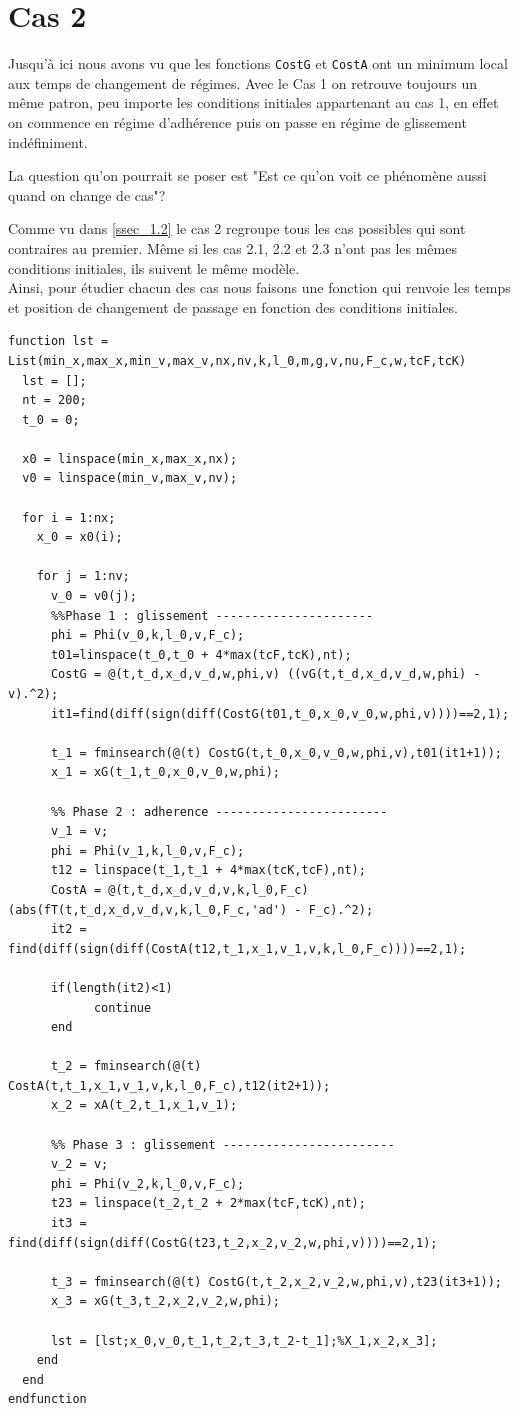\documentclass{article}
\begin{document}
\newpage
\section{Cas 2}
Jusqu'à ici nous avons vu que les fonctions \verb|CostG| et \verb|CostA| ont un minimum local aux temps de changement de régimes. Avec le Cas 1 on retrouve toujours un même patron, peu importe les conditions initiales appartenant au cas 1, en effet on commence en régime d'adhérence puis on passe en régime de glissement indéfiniment.

La question qu'on pourrait se poser est "Est ce qu'on voit ce phénomène aussi quand on change de cas"?


Comme vu dans \ref{ssec_1.2} le cas 2 regroupe tous les cas possibles qui sont contraires au premier. Même si les cas 2.1, 2.2 et 2.3 n'ont pas les mêmes conditions initiales, ils suivent le même modèle.\\
Ainsi, pour étudier chacun des cas nous faisons une fonction qui renvoie les temps et position de changement de passage en fonction des conditions initiales.

\begin{lstlisting}
function lst = List(min_x,max_x,min_v,max_v,nx,nv,k,l_0,m,g,v,nu,F_c,w,tcF,tcK)
  lst = [];
  nt = 200;
  t_0 = 0;
  
  x0 = linspace(min_x,max_x,nx);
  v0 = linspace(min_v,max_v,nv);

  for i = 1:nx;
    x_0 = x0(i);
    
    for j = 1:nv;
      v_0 = v0(j);
      %%Phase 1 : glissement ----------------------
      phi = Phi(v_0,k,l_0,v,F_c);
      t01=linspace(t_0,t_0 + 4*max(tcF,tcK),nt);
      CostG = @(t,t_d,x_d,v_d,w,phi,v) ((vG(t,t_d,x_d,v_d,w,phi) - v).^2);
      it1=find(diff(sign(diff(CostG(t01,t_0,x_0,v_0,w,phi,v))))==2,1);
      
      t_1 = fminsearch(@(t) CostG(t,t_0,x_0,v_0,w,phi,v),t01(it1+1));
      x_1 = xG(t_1,t_0,x_0,v_0,w,phi);
      
      %% Phase 2 : adherence ------------------------
      v_1 = v;
      phi = Phi(v_1,k,l_0,v,F_c);
      t12 = linspace(t_1,t_1 + 4*max(tcK,tcF),nt);      
      CostA = @(t,t_d,x_d,v_d,v,k,l_0,F_c) (abs(fT(t,t_d,x_d,v_d,v,k,l_0,F_c,'ad') - F_c).^2);
      it2 = find(diff(sign(diff(CostA(t12,t_1,x_1,v_1,v,k,l_0,F_c))))==2,1);

      if(length(it2)<1)
            continue
      end

      t_2 = fminsearch(@(t) CostA(t,t_1,x_1,v_1,v,k,l_0,F_c),t12(it2+1));
      x_2 = xA(t_2,t_1,x_1,v_1);
      
      %% Phase 3 : glissement ------------------------
      v_2 = v;
      phi = Phi(v_2,k,l_0,v,F_c);
      t23 = linspace(t_2,t_2 + 2*max(tcF,tcK),nt);
      it3 = find(diff(sign(diff(CostG(t23,t_2,x_2,v_2,w,phi,v))))==2,1);
      
      t_3 = fminsearch(@(t) CostG(t,t_2,x_2,v_2,w,phi,v),t23(it3+1));
      x_3 = xG(t_3,t_2,x_2,v_2,w,phi);

      lst = [lst;x_0,v_0,t_1,t_2,t_3,t_2-t_1];%X_1,x_2,x_3];
    end
  end
endfunction
\end{lstlisting}
\end{document}
